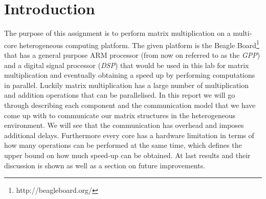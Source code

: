 \section{Introduction}

The purpose of this assignment is to perform matrix multiplication on a multi-core heterogeneous computing platform. The given platform is the Beagle Board\footnote{http://beagleboard.org/} that has a general purpose ARM processor (from now on referred to as the \emph{GPP}) and a digital signal processor (\emph{DSP}) that would be used in this lab for matrix multiplication and eventually obtaining a speed up by performing computations in parallel. Luckily matrix multiplication has a large number of multiplication and addition operations that can be parallelised. In this report we will go through describing each component and the communication model that we have come up with to communicate our matrix structures in the heterogeneous environment. We will see that the communication has overhead and imposes additional delays. Furthermore every core has a hardware limitation in terms of how many operations can be performed at the same time, which defines the upper bound on how much speed-up can be obtained. At last results and their discussion is shown as well as a section on future improvements.
